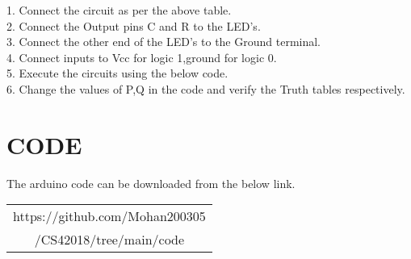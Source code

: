 \documentclass[a4paper,11pt,twocolumn]{article}
\begin{document}
   1. Connect the circuit as per the above table.\\
   2. Connect the Output pins C and R to the LED's.\\
   3. Connect the other end of the LED's to the Ground terminal.\\
   4. Connect inputs to Vcc for logic 1,ground for logic 0.\\
   5. Execute the circuits using the below code.\\
   6. Change the values of P,Q in the code and verify the Truth tables respectively.\\

\section{CODE}
	The arduino code can be downloaded from the below link.
\begin{table}[h]
	\centering
	\begin{tabular}{|c|}
		\hline
                 https://github.com/Mohan200305\\
		 /CS42018/tree/main/code\\
		 \hline
	\end{tabular}
\end{table}
\end{document}
